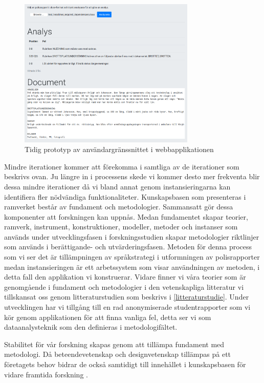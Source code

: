 \documentclass[swedish]{maucsthesis}
\begin{document}
\begin{figure}[H]
    \centering
    \includegraphics[width=0.75\textwidth]{tidigprototyp.png}
    \caption{Tidig prototyp av användargränssnittet i webbapplikationen}
    \label{fig:tidigprototyp}
\end{figure}

Mindre iterationer kommer att förekomma i samtliga av de iterationer som beskrivs ovan. Ju
längre in i processens skede vi kommer desto mer frekventa blir dessa mindre
iterationer då vi bland annat genom instansieringarna kan identifiera fler
nödvändiga funktionaliteter. Kunskapsbasen som presenteras i ramverket består av
fundament och metodologier. Sammansatt gör dessa komponenter att forskningen kan
uppnås. Medan fundamentet skapar teorier, ramverk, instrument, konstruktioner,
modeller, metoder och instanser som används under utvecklingsfasen i
forskningsstudien skapar metodologier riktlinjer som används i berättigande- och
utvärderingsfasen. Metoden för denna process som vi ser det är tillämpningen av
språkstrategi i utformningen av polisrapporter medan instansieringen är ett
arbetssystem som visar användningen av metoden, i detta fall den applikation vi
konstruerar. Vidare finner vi våra teorier som är genomgående i fundament och
metodologier i den vetenskapliga litteratur vi tillskansat oss genom
litteraturstudien som beskrivs i \cref{litteraturstudie}. Under utvecklingen har vi
tillgång till en rad anonymiserade studentrapporter som vi kör genom
applikationen för att finna vanliga fel, detta ser vi som dataanalysteknik som
den definieras i metodologifältet.

Stabilitet för vår forskning skapas genom att tillämpa fundament med metodologi.
Då beteendevetenskap och designvetenskap tillämpas på ett företagets behov
bidrar de också samtidigt till innehållet i kunskapsbasen för vidare framtida
forskning \cite{hevner:2004}.
\end{document}
